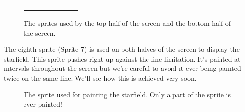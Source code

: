 \begin{figure}[H]
{\begin{adjustbox}{width=14cm,center}
\begin{tabular}{ccccccc}
{} & 
\makecell[l]{
	\begin{subfigure}{0.3\textwidth}
    \def\MULTICOLORONE{gray}
    \def\MULTICOLORTWO{white}
    \def\SPRITECOLOR{red}
		
	\end{subfigure}
} & 
\makecell[l]{
	\begin{subfigure}{0.3\textwidth}
    \def\MULTICOLORONE{gray}
    \def\MULTICOLORTWO{white}
    \def\SPRITECOLOR{orange}
		
	\end{subfigure}
} & 
\makecell[l]{
	\begin{subfigure}{0.3\textwidth}
    \def\MULTICOLORONE{gray}
    \def\MULTICOLORTWO{white}
    \def\SPRITECOLOR{yellow}
		
	\end{subfigure}
} & 
\makecell[l]{
	\begin{subfigure}{0.3\textwidth}
    \def\MULTICOLORONE{gray}
    \def\MULTICOLORTWO{white}
    \def\SPRITECOLOR{green}
		
	\end{subfigure}
} & 
\makecell[l]{
	\begin{subfigure}{0.3\textwidth}
    \def\MULTICOLORONE{gray}
    \def\MULTICOLORTWO{white}
    \def\SPRITECOLOR{lightblue}
		
	\end{subfigure}
} & 
\makecell[l]{
	\begin{subfigure}{0.3\textwidth}
    \def\MULTICOLORONE{gray}
    \def\MULTICOLORTWO{white}
    \def\SPRITECOLOR{purple}
		
	\end{subfigure}
} \\ 
        \addlinespace
        \bottomrule
      \end{tabular}
    \end{adjustbox}
  }\caption{The sprites used by the top half of the screen and the bottom half of the screen.}
\end{figure}

The eighth sprite (Sprite 7) is used on both halves of the screen to display the starfield. This
sprite pushes right up against the line limitation. It's painted at intervals throughout the screen
but we're careful to avoid it ever being painted twice on the same line. We'll see how this is
achieved very soon.


\begin{figure}[H]
  {
    \setlength{\tabcolsep}{1.0pt}
    \setlength\cmidrulewidth{\heavyrulewidth} %
    \begin{adjustbox}{width=4cm,center}
	\begin{subfigure}{0.3\textwidth}
    \def\MULTICOLORONE{gray}
    \def\MULTICOLORTWO{gray}
    \def\SPRITECOLOR{gray}
		
	\end{subfigure}
    \end{adjustbox}
  }\caption{The sprite used for painting the starfield. Only a part of the sprite is ever painted!}
\end{figure}

